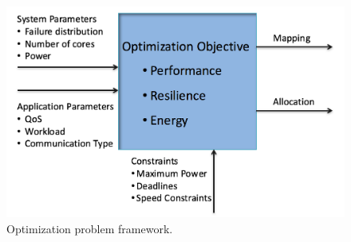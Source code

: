 \begin{figure}[!t]
  \begin{center}
      \includegraphics[width=0.7\columnwidth]{figures/opt_problem.png}
  \end{center}
  \caption{Optimization problem framework.}
  \label{fig:opt_problem}
\end{figure}